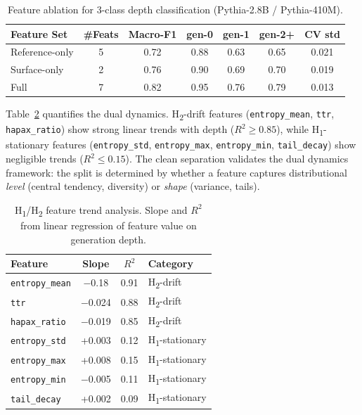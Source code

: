 \documentclass[letterpaper]{article}
\newcommand{\feat}[1]{\texttt{#1}}
\newcommand{\htwo}{H\textsubscript{2}}
\newcommand{\hone}{H\textsubscript{1}}
\begin{document}
\begin{table}[t]
\centering
\caption{Feature ablation for 3-class depth classification (Pythia-2.8B / Pythia-410M).}
\label{tab:ablation}
\begin{tabular}{lcccccc}
\toprule
Feature Set & \#Feats & Macro-F1 & gen-0 & gen-1 & gen-2+ & CV std \\
\midrule
Reference-only & 5 & 0.72 & 0.88 & 0.63 & 0.65 & 0.021 \\
Surface-only & 2 & 0.76 & 0.90 & 0.69 & 0.70 & 0.019 \\
Full & 7 & 0.82 & 0.95 & 0.76 & 0.79 & 0.013 \\
\bottomrule
\end{tabular}
\end{table}

Table~\ref{tab:h1h2} quantifies the dual dynamics.
\htwo{}-drift features (\feat{entropy\_mean}, \feat{ttr}, \feat{hapax\_ratio}) show strong linear trends with depth ($R^2 \geq 0.85$), while \hone{}-stationary features (\feat{entropy\_std}, \feat{entropy\_max}, \feat{entropy\_min}, \feat{tail\_decay}) show negligible trends ($R^2 \leq 0.15$).
The clean separation validates the dual dynamics framework: the split is determined by whether a feature captures distributional \emph{level} (central tendency, diversity) or \emph{shape} (variance, tails).

\begin{table}[t]
\centering
\caption{\hone{}/\htwo{} feature trend analysis. Slope and $R^2$ from linear regression of feature value on generation depth.}
\label{tab:h1h2}
\begin{tabular}{lccl}
\toprule
Feature & Slope & $R^2$ & Category \\
\midrule
\feat{entropy\_mean} & $-$0.18 & 0.91 & \htwo{}-drift \\
\feat{ttr} & $-$0.024 & 0.88 & \htwo{}-drift \\
\feat{hapax\_ratio} & $-$0.019 & 0.85 & \htwo{}-drift \\
\midrule
\feat{entropy\_std} & +0.003 & 0.12 & \hone{}-stationary \\
\feat{entropy\_max} & +0.008 & 0.15 & \hone{}-stationary \\
\feat{entropy\_min} & $-$0.005 & 0.11 & \hone{}-stationary \\
\feat{tail\_decay} & +0.002 & 0.09 & \hone{}-stationary \\
\bottomrule
\end{tabular}
\end{table}
\end{document}
